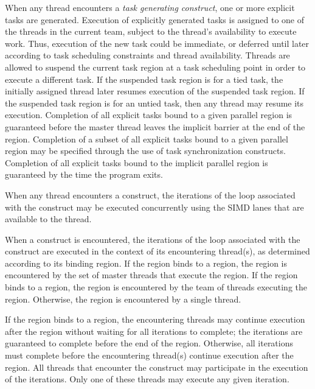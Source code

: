 When any thread encounters a \emph{task generating construct}, one or more explicit 
tasks are generated. Execution of explicitly generated tasks is assigned to one of 
the threads in the current team, subject to the thread's availability to execute 
work. Thus, execution of the new task could be immediate, or deferred until later 
according to task scheduling constraints and thread availability. Threads are 
allowed to suspend the current task region at a task scheduling point in order 
to execute a different task. If the suspended task region is for a tied task, 
the initially assigned thread later resumes execution of the suspended task
region. If the suspended task region is for an untied task, then any thread may 
resume its execution. Completion of all explicit tasks bound to a given parallel 
region is guaranteed before the master thread leaves the implicit barrier at the 
end of the region. Completion of a subset of all explicit tasks bound to a given 
parallel region may be specified through the use of task synchronization constructs. 
Completion of all explicit tasks bound to the
implicit parallel region is guaranteed by the time the program exits.

When any thread encounters a  construct, the iterations of the loop 
associated with the construct may be executed concurrently using the SIMD lanes 
that are available to the thread.

When a  construct is encountered, the iterations of the loop
associated with the construct are executed in the context of its encountering
thread(s), as determined according to its binding region. If the 
region binds to a  region, the region is encountered by the set
of master threads that execute the  region. If the 
region binds to a  region, the region is encountered by the team
of threads executing the  region. Otherwise, the region is
encountered by a single thread.

If the  region binds to a  region, the encountering
threads may continue execution after the  region without waiting
for all iterations to complete; the iterations are guaranteed to complete
before the end of the  region.  Otherwise, all iterations must
complete before the encountering thread(s) continue execution after the
 region. All threads that encounter the  construct may
participate in the execution of the iterations. Only one of these threads may
execute any given iteration.

